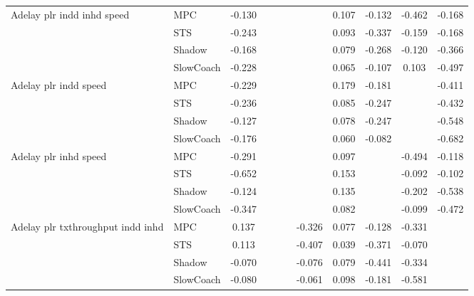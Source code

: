 \begin{tabular}{|l|l|*{9}{c|}}
\midrule
Adelay plr indd inhd speed    & MPC &   -0.130 &        &        &     &     &  0.107 &  -0.132 &  -0.462 &   -0.168 \\
                              & STS &   -0.243 &        &        &     &     &  0.093 &  -0.337 &  -0.159 &   -0.168 \\
                              & Shadow &   -0.168 &        &        &     &     &  0.079 &  -0.268 &  -0.120 &   -0.366 \\
                              & SlowCoach &   -0.228 &        &        &     &     &  0.065 &  -0.107 &   0.103 &   -0.497 \\
\midrule
Adelay plr indd speed    & MPC &   -0.229 &        &        &     &     &  0.179 &  -0.181 &      &   -0.411 \\
                              & STS &   -0.236 &        &        &     &     &  0.085 &  -0.247 &      &   -0.432 \\
                              & Shadow &   -0.127 &        &        &     &     &  0.078 &  -0.247 &      &   -0.548 \\
                              & SlowCoach &   -0.176 &        &        &     &     &  0.060 &  -0.082 &      &   -0.682 \\
\midrule
Adelay plr inhd speed    & MPC &   -0.291 &        &        &     &     &  0.097 &      &  -0.494 &   -0.118 \\
                              & STS &   -0.652 &        &        &     &     &  0.153 &      &  -0.092 &   -0.102 \\
                              & Shadow &   -0.124 &        &        &     &     &  0.135 &      &  -0.202 &   -0.538 \\
                              & SlowCoach &   -0.347 &        &        &     &     &  0.082 &      &  -0.099 &   -0.472 \\
\midrule
Adelay plr txthroughput indd inhd    & MPC &    0.137 &        &        &     & -0.326 &  0.077 &  -0.128 &  -0.331 &       \\
                              & STS &    0.113 &        &        &     & -0.407 &  0.039 &  -0.371 &  -0.070 &       \\
                              & Shadow &   -0.070 &        &        &     & -0.076 &  0.079 &  -0.441 &  -0.334 &       \\
                              & SlowCoach &   -0.080 &        &        &     & -0.061 &  0.098 &  -0.181 &  -0.581 &       \\

\end{tabular}
